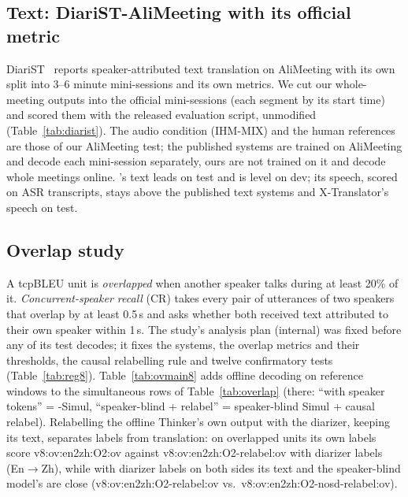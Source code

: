 \subsection{Text: DiariST-AliMeeting with its official metric}
\label{app:diarist}
DiariST~\citep{yang2024diarist} reports speaker-attributed text translation on AliMeeting with its own split into 3--6
minute mini-sessions and its own metrics. We cut our whole-meeting outputs into the official mini-sessions (each
segment by its start time) and scored them with the released evaluation script, unmodified (Table~\ref{tab:diarist}).
The audio condition (IHM-MIX) and the human references are those of our AliMeeting test; the published systems are
trained on AliMeeting and decode each mini-session separately, ours are not trained on it and decode whole meetings
online. \sys{}'s text leads on test and is level on dev; its speech, scored on ASR transcripts, stays above the
published text systems and X-Translator's speech on test.


\subsection{Overlap study}
\label{app:v8}
\label{sec:eval-overlap}
A tcpBLEU unit is \emph{overlapped} when another speaker talks during at least 20\% of it. \emph{Concurrent-speaker
recall} (CR) takes every pair of utterances of two speakers that overlap by at least 0.5\,s and asks whether both
received text attributed to their own speaker within 1\,s. The study's analysis plan (internal) was fixed before any of
its test decodes; it fixes the systems, the overlap metrics and their thresholds, the causal relabelling rule and twelve
confirmatory tests (Table~\ref{tab:reg8}). Table~\ref{tab:ovmain8} adds offline decoding on reference windows to the
simultaneous rows of Table~\ref{tab:overlap} (there: ``with speaker tokens'' = \sys{}-Simul, ``speaker-blind +
relabel'' = speaker-blind Simul + causal relabel). Relabelling the offline Thinker's own output with the diarizer,
keeping its text, separates labels from translation: on overlapped units its own labels score
\num{v8:ov:en2zh:O2:ov} against \num{v8:ov:en2zh:O2-relabel:ov} with diarizer labels (En$\rightarrow$Zh), while with
diarizer labels on both sides its text and the speaker-blind model's are close
(\num{v8:ov:en2zh:O2-relabel:ov} vs.\ \num{v8:ov:en2zh:O2-nosd-relabel:ov}).



